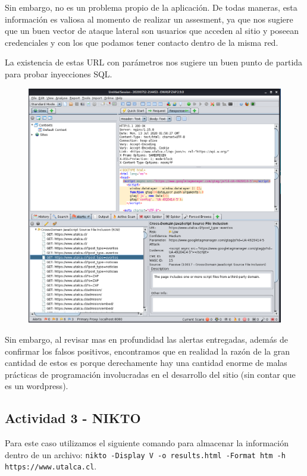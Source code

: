 \documentclass[11pt]{utalcaDoc}
\begin{document}
Sin embargo, no es un problema propio de la aplicación. De todas maneras, esta información es valiosa al momento de realizar un assesment, ya que nos sugiere que un buen vector de ataque lateral son usuarios que acceden al sitio y poseean credenciales y con los que podamos tener contacto dentro de la misma red.

La existencia de estas URL con parámetros nos sugiere un buen punto de partida para probar inyecciones SQL.

\begin{figure}[H]
	\centering
	\includegraphics[width=.75\textwidth]{images2/zap3.png}
\end{figure}

Sin embargo, al revisar mas en profundidad las alertas entregadas, además de confirmar los falsos positivos, encontramos que en realidad la razón de la gran cantidad de estos es porque derechamente hay una cantidad enorme de malas prácticas de programación involucradas en el desarrollo del sitio (sin contar que es un wordpress).



\subsection{Actividad 3 - NIKTO}

Para este caso utilizamos el siguiente comando para almacenar la información dentro de un archivo: \texttt{nikto -Display V -o results.html -Format htm -h https://www.utalca.cl}. 
\end{document}
